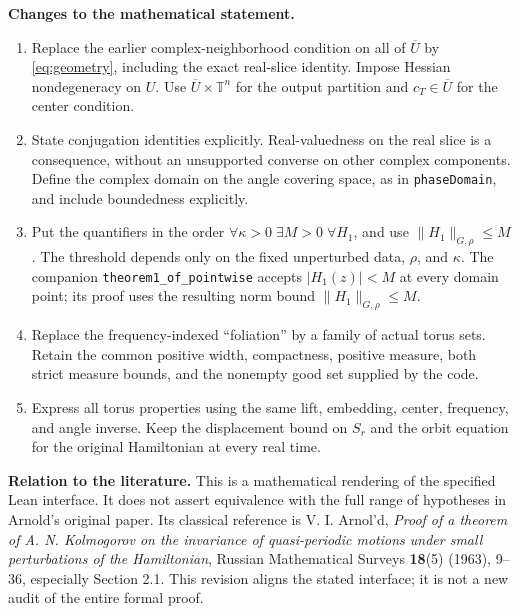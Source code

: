 \documentclass[11pt,a4paper]{article}
\newcommand{\T}{\mathbb T}
\newcommand{\norm}[1]{\lVert #1\rVert}
\newcommand{\code}[1]{\texttt{\small #1}}
\begin{document}
\textbf{Changes to the mathematical statement.}
\begin{enumerate}[label=\arabic*.]
\item Replace the earlier complex-neighborhood condition on all of
\(\overline U\) by \eqref{eq:geometry}, including the exact real-slice
identity. Impose Hessian nondegeneracy on \(U\). Use
\(\overline U\times\T^n\) for the output partition and \(c_T\in\overline U\)
for the center condition.
\item State conjugation identities explicitly. Real-valuedness on the real
slice is a consequence, without an unsupported converse on other complex
components. Define the complex domain on the angle covering space, as in
\code{phaseDomain}, and include boundedness explicitly.
\item Put the quantifiers in the order \(\forall\kappa>0\;\exists M>0\;
\forall H_1\), and use \(\norm{H_1}_{G,\rho}\le M\). The threshold depends
only on the fixed unperturbed data, \(\rho\), and \(\kappa\). The companion
\code{theorem1\_of\_pointwise} accepts \(|H_1(z)|<M\) at every domain point;
its proof uses the resulting norm bound \(\norm{H_1}_{G,\rho}\le M\).
\item Replace the frequency-indexed ``foliation'' by a family of actual
torus sets. Retain the common positive width, compactness, positive measure,
both strict measure bounds, and the nonempty good set supplied by the code.
\item Express all torus properties using the same lift, embedding, center,
frequency, and angle inverse. Keep the displacement bound on \(S_r\) and
the orbit equation for the original Hamiltonian at every real time.
\end{enumerate}

\textbf{Relation to the literature.} This is a mathematical rendering of
the specified Lean interface. It does not assert equivalence with the full
range of hypotheses in Arnold's original paper. Its classical reference is
V. I. Arnol'd, \emph{Proof of a theorem of A. N. Kolmogorov on the invariance
of quasi-periodic motions under small perturbations of the Hamiltonian},
Russian Mathematical Surveys \textbf{18}(5) (1963), 9--36, especially
Section 2.1. This revision aligns the stated interface; it is not a new
audit of the entire formal proof.
\end{document}
